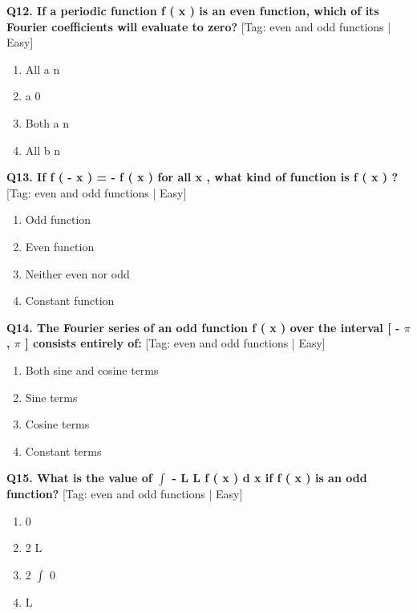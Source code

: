 \noindent\textbf{Q12. If a periodic function f ( x ) is an even function, which of its Fourier coefficients will evaluate to zero?} \hfill [Tag: even and odd functions | Easy]
\begin{enumerate}[label=(\alph*),topsep=2pt,itemsep=1pt,partopsep=0pt,parsep=0pt]
    \item {{All a n}}
    \item {{a 0}}
    \item {{Both a n}}
    \item {{All b n}}
\end{enumerate}
\vspace{2mm}

\noindent\textbf{Q13. If f ( - x ) = - f ( x ) for all x , what kind of function is f ( x ) ?} \hfill [Tag: even and odd functions | Easy]
\begin{enumerate}[label=(\alph*),topsep=2pt,itemsep=1pt,partopsep=0pt,parsep=0pt]
    \item {{Odd function}}
    \item {{Even function}}
    \item {{Neither even nor odd}}
    \item {{Constant function}}
\end{enumerate}
\vspace{2mm}

\noindent\textbf{Q14. The Fourier series of an odd function f ( x ) over the interval [ - $\pi$ , $\pi$ ] consists entirely of:} \hfill [Tag: even and odd functions | Easy]
\begin{enumerate}[label=(\alph*),topsep=2pt,itemsep=1pt,partopsep=0pt,parsep=0pt]
    \item {{Both sine and cosine terms}}
    \item {{Sine terms}}
    \item {{Cosine terms}}
    \item {{Constant terms}}
\end{enumerate}
\vspace{2mm}

\noindent\textbf{Q15. What is the value of $\int$ - L L f ( x ) d x if f ( x ) is an odd function?} \hfill [Tag: even and odd functions | Easy]
\begin{enumerate}[label=(\alph*),topsep=2pt,itemsep=1pt,partopsep=0pt,parsep=0pt]
    \item {{0}}
    \item {{2 L}}
    \item {{2 $\int$ 0}}
    \item {{L}}
\end{enumerate}
\vspace{2mm}

